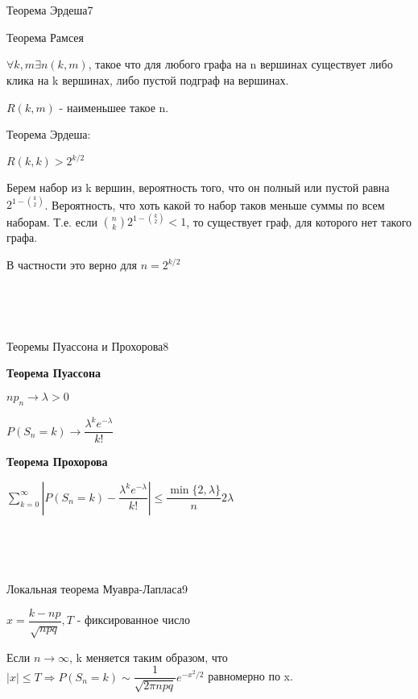 \documentclass{article}
\begin{document}
~\

~\

\begin{question}{Теорема Эрдеша}{7}

Теорема Рамсея

$\forall k, m \exists n(k, m)$, такое что для любого графа на n вершинах существует либо клика на k вершинах, либо пустой подграф на вершинах.

$R(k, m)$ - наименьшее такое n.

Теорема Эрдеша:

$R(k, k) > 2^{k / 2}$

Берем набор из k вершин, вероятность того, что он полный или пустой равна $2^{1 - {k \choose 2}}$. Вероятность, что хоть какой то набор таков меньше суммы по всем наборам. Т.е. если ${n \choose k} 2^{1 - {k \choose 2}} < 1$, то существует граф, для которого нет такого графа.

В частности это верно для $n = 2^{k/2}$

\end{question}

~\

~\

\begin{question}{Теоремы Пуассона и Прохорова}{8}

\textbf{Теорема Пуассона}

$np_n \rightarrow \lambda > 0$

$P(S_n = k) \rightarrow \dfrac{\lambda^k e^{- \lambda}}{k!}$

\textbf{Теорема Прохорова}

$\sum\limits_{k = 0}^\infty{|P(S_n = k) - \dfrac{\lambda^k e^{- \lambda}}{k!}|} \leq \dfrac{\min{\{2, \lambda\}}}{n} 2 \lambda$

\end{question}

~\

~\

\begin{question}{Локальная теорема Муавра-Лапласа}{9}

$x = \dfrac{k - np}{\sqrt{npq}}, T$ - фиксированное число

Если $n \rightarrow \infty$, k меняется таким образом, что $|x| \leq T \Rightarrow P(S_n = k) \sim \dfrac{1}{\sqrt{2 \pi n p q}}e^{-x^2/2}$ равномерно по x.

\end{question}

~\

~\
\end{document}
